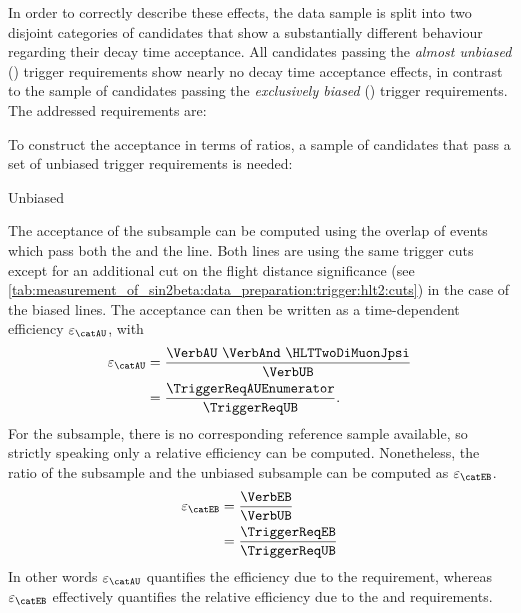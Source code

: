 In order to correctly describe these effects, the data sample is split into two
disjoint categories of candidates that show a substantially different behaviour
regarding their decay time acceptance. All candidates passing the \emph{almost
unbiased} (\textbf{\catAU}) trigger requirements show nearly no decay time
acceptance effects, in contrast to the sample of candidates passing the
\emph{exclusively biased} (\textbf{\catEB}) trigger requirements. The addressed
requirements are:
%
\begin{description}
  \item[\catAU] \TriggerReqAU
  \item[\catEB] \TriggerReqEB
\end{description}
%
To construct the acceptance in terms of ratios, a sample of candidates that pass
a set of unbiased trigger requirements is needed:
%
\begin{description}
  \item[Unbiased] \TriggerReqUB
\end{description}
%
The acceptance of the \catAU subsample can be computed using the overlap of events
which pass both the \HLTTwoDiMuonDetachedJpsi and the
\HLTTwoDiMuonJpsi line. Both lines are using the same trigger cuts except for
an additional cut on the flight distance significance (see
\cref{tab:measurement_of_sin2beta:data_preparation:trigger:hlt2:cuts}) in the
case of the biased lines. The acceptance can then be written as a time-dependent
efficiency $\varepsilon_\text{\catAU}$, with
%
\begin{equation}
  \begin{split}
    \varepsilon_\text{\catAU} &= \frac{\text{\VerbAU \VerbAnd \HLTTwoDiMuonJpsi}}{\text{\VerbUB}}\\
                              &= \frac{\text{\TriggerReqAUEnumerator}}{\text{\TriggerReqUB}}.
  \end{split}
\end{equation} 
%
For the \catEB subsample, there is no corresponding reference sample available,
so strictly speaking only a relative efficiency can be computed. Nonetheless,
the ratio of the \catEB subsample and the unbiased subsample can be computed as
$\varepsilon_\text{\catEB}$.
%
\begin{equation}
  \begin{split}
    \varepsilon_\text{\catEB} &= \frac{\text{\VerbEB}}{\text{\VerbUB}}\\
                              &= \frac{\text{\TriggerReqEB}}{\text{\TriggerReqUB}}
  \end{split}
\end{equation}
%
In other words $\varepsilon_\text{\catAU}$ quantifies the efficiency due to the
\HLTTwoDiMuonDetachedJpsi requirement, whereas $\varepsilon_\text{\catEB}$
effectively quantifies the relative efficiency due to the \HLTOneTrackMuon and
\HLTTwoDiMuonDetachedJpsi requirements.

